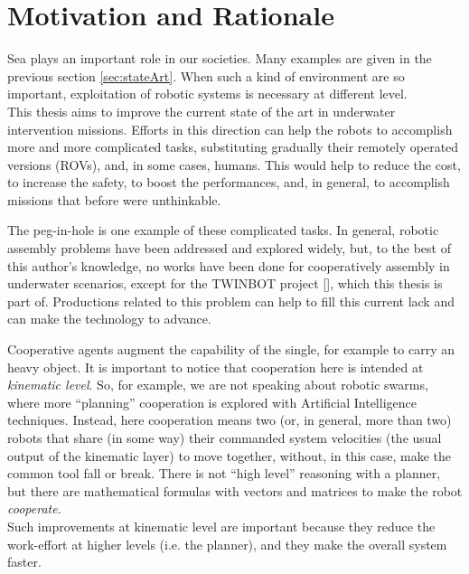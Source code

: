 \section{Motivation and Rationale}
Sea plays an important role in our societies. Many examples are given in the previous section \ref{sec:stateArt}. When such a kind of environment are so important, exploitation of robotic systems is necessary at different level.\\
This thesis aims to improve the current state of the art in underwater intervention missions. Efforts in this direction can help the robots to accomplish more and more complicated tasks, substituting gradually their remotely operated versions (ROVs), and, in some cases, humans. This would help to reduce the cost, to increase the safety, to boost the performances, and, in general, to accomplish missions that before were unthinkable.

The peg-in-hole is one example of these complicated tasks. In general, robotic assembly problems have been addressed and explored widely, but, to the best of this author's knowledge, no works have been done for cooperatively assembly in underwater scenarios, except for the TWINBOT project [\cite{TWINBOT2019}], which this thesis is part of. Productions related to this problem can help to fill this current lack and can make the technology to advance. 

Cooperative agents augment the capability of the single, for example to carry an heavy object. It is important to notice that cooperation here is intended at \textit{kinematic level}. So, for example, we are not speaking about robotic swarms, where more \enquote{planning} cooperation is explored with Artificial Intelligence techniques. Instead, here cooperation means two (or, in general, more than two) robots that share (in some way) their commanded system velocities (the usual output of the kinematic layer) to move together, without, in this case, make the common tool fall or break. There is not \enquote{high level} reasoning with a planner, but there are mathematical formulas with vectors and matrices to make the robot \textit{cooperate}.\\
Such improvements at kinematic level are important because they reduce the work-effort at higher levels (i.e. the planner), and they make the overall system faster.\\

